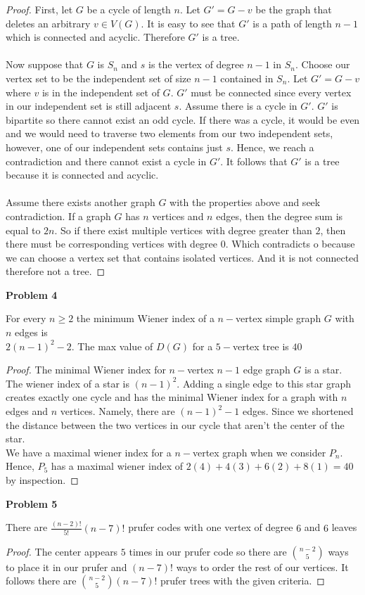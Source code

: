 \documentclass{article}
\newenvironment{claim}[2][Claim]{\begin{trivlist}
		\item[\hskip \labelsep {\bfseries #1}\hskip \labelsep {\bfseries #2}]}{\end{trivlist}}
\begin{document}
\begin{proof}
	First, let $G$ be a cycle of length $n$. Let $G' = G - v$ be the graph that deletes an arbitrary $v \in V(G)$. It is easy to see that $G'$ is a path of length $n - 1$ which is connected and acyclic. Therefore $G'$ is a tree.\\ \\
	Now suppose that $G$ is $S_n$ and $s$ is the vertex of degree $n - 1$ in $S_n$. Choose our vertex set to be the independent set of size $n - 1$ contained in $S_n$. Let $G' = G - v$ where $v$ is in the independent set of $G$. $G'$ must be connected since every vertex in our independent set is still adjacent $s$. Assume there is a cycle in $G'$. $G'$ is bipartite so there cannot exist an odd cycle. If there was a cycle, it would be even and we would need to traverse two elements from our two independent sets, however, one of our independent sets contains just $s$.	Hence, we reach a contradiction and there cannot exist a cycle in $G'$. It follows that $G'$ is a tree because it is connected and acyclic.\\ \\
	Assume there exists another graph $G$ with the properties above and seek contradiction. 
	If a graph $G$ has $n$ vertices and $n$ edges, then the degree sum is equal to $2n$. So if there exist multiple vertices with degree greater than $2$, then there must be corresponding vertices with degree $0$. Which contradicts  o because we can choose a vertex set that contains isolated vertices. And it is not connected therefore not a tree.
\end{proof}

\noindent \textbf{Problem 4}
\begin{claim}{}
	For every $n \geq 2$ the minimum Wiener index of a $n-$vertex simple graph $G$ with $n$ edges is \\$2(n-1)^2 - 2$. The max value of $D(G)$ for a $5-$vertex tree is $40$
\end{claim}
\begin{proof}
	The minimal Wiener index for $n-$vertex $n-1$ edge graph $G$ is a star. The wiener index of a star is $(n-1)^2$. Adding a single edge to this star graph creates exactly one cycle and has the minimal Wiener index for a graph with $n$ edges and $n$ vertices. Namely, there are $(n-1)^2 - 1$ edges. Since we shortened the distance between the two vertices in our cycle that aren't the center of the star.\\
	We have a maximal wiener index for a $n-$vertex graph when we consider $P_n$. Hence, $P_5$ has a maximal wiener index of $2(4) + 4(3) + 6(2) + 8(1) = 40$ by inspection.
\end{proof}

\noindent \textbf{Problem 5}
\begin{claim}{}
	There are $\frac{(n - 2)!}{5!}(n - 7)!$ prufer codes with one vertex of degree $6$ and $6$ leaves
\end{claim}
\begin{proof}
	The center appears $5$ times in our prufer code so there are $\binom{n-2}{5}$ ways to place it in our prufer and $(n-7)!$ ways to order the rest of our vertices. It follows there are $\binom{n-2}{5}(n-7)!$ prufer trees with the given criteria.
\end{proof}
\end{document}
